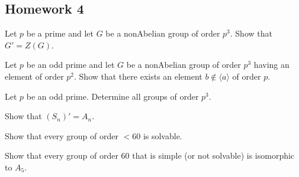 \subsection{Homework 4}
\begin{problem}
  Let $p$ be a prime and let $G$ be a nonAbelian group of order $p^3$. Show
  that $G'=Z(G)$.
\end{problem}
\begin{solution}
\end{solution}

\begin{problem}
  Let $p$ be an odd prime and let $G$ be a nonAbelian group of order $p^3$
  having an element of order $p^2$. Show that there exists an element
  $b\notin\langle a \rangle$ of order $p$.
\end{problem}
\begin{solution}
\end{solution}

\begin{problem}
  Let $p$ be an odd prime. Determine all groups of order $p^3$.
\end{problem}
\begin{solution}
\end{solution}

\begin{problem}
  Show that $(S_n)'=A_n$.
\end{problem}
\begin{solution}
\end{solution}

\begin{problem}
  Show that every group of order $<60$ is solvable.
\end{problem}
\begin{solution}
\end{solution}

\begin{problem}
  Show that every group of order $60$ that is simple (or not solvable) is
  isomorphic to $A_5$.
\end{problem}
\begin{solution}
\end{solution}

